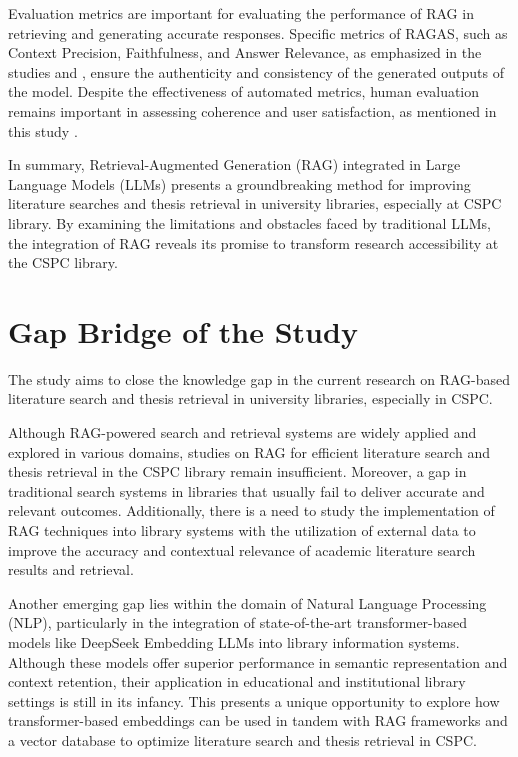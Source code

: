 \begin{refsection}
\hspace{0.4cm}Evaluation metrics are important for evaluating the performance of RAG in retrieving and generating accurate responses. Specific metrics of RAGAS, such as Context Precision, Faithfulness, and Answer Relevance, as emphasized in the studies \cite{sagi2024genai} and \cite{arzideh2024miracle}, ensure the authenticity and consistency of the generated outputs of the model. Despite the effectiveness of automated metrics, human evaluation remains important in assessing coherence and user satisfaction, as mentioned in this study \cite{aquino2024extracting}.

\hspace{0.4cm} In summary, Retrieval-Augmented Generation (RAG) integrated in Large Language Models (LLMs) presents a groundbreaking method for improving literature searches and thesis retrieval in university libraries, especially at CSPC library. By examining the limitations and obstacles faced by traditional LLMs, the integration of RAG reveals its promise to transform research accessibility at the CSPC library.

\section{Gap Bridge of the Study}
\hspace{1cm}The study aims to close the knowledge gap in the current research on RAG-based literature search and thesis retrieval in university libraries, especially in CSPC.

\bigbreak
\hspace{0.4cm}Although RAG-powered search and retrieval systems are widely applied and explored in various domains, studies on RAG for efficient literature search and thesis retrieval in the CSPC library remain insufficient. Moreover, a gap in traditional search systems in libraries that usually fail to deliver accurate and relevant outcomes. Additionally, there is a need to study the implementation of RAG techniques into library systems with the utilization of external data to improve the accuracy and contextual relevance of academic literature search results and retrieval. 

\hspace{0.4cm}Another emerging gap lies within the domain of Natural Language Processing (NLP), particularly in the integration of state-of-the-art transformer-based models like DeepSeek Embedding LLMs into library information systems. Although these models offer superior performance in semantic representation and context retention, their application in educational and institutional library settings is still in its infancy. This presents a unique opportunity to explore how transformer-based embeddings can be used in tandem with RAG frameworks and a vector database to optimize literature search and thesis retrieval in CSPC.


\end{refsection}
